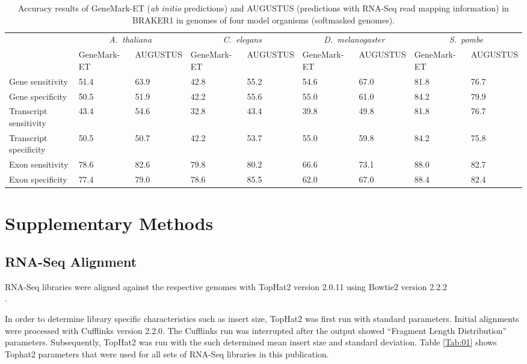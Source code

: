 \documentclass[a4paper,10pt]{report}
\begin{document}
\begin{sidewaystable}
\caption{Accuracy results of GeneMark-ET (\textit{ab initio} predictions) and AUGUSTUS (predictions with RNA-Seq read mapping information) in BRAKER1 in genomes of four model organisms (softmasked genomes).\label{compare}}
\begin{tabular}{lp{1.5cm}p{1.2cm}p{1.5cm}p{1.2cm}p{1.5cm}p{1.2cm}p{1.5cm}p{1.2cm}}\hline
 & \multicolumn{2}{c}{\textit{A.~thaliana}} &  \multicolumn{2}{c}{\textit{C.~elegans}} &  \multicolumn{2}{c}{\textit{D.~melanogaster}} &  \multicolumn{2}{c}{\textit{S.~pombe}}\\
 & \tiny{GeneMark-ET} & \tiny{AUGUSTUS} & \tiny{GeneMark-ET} & \tiny{AUGUSTUS} &  \tiny{GeneMark-ET} & \tiny{AUGUSTUS} & \tiny{GeneMark-ET} &\tiny{AUGUSTUS}\\
 \hline
Gene sensitivity        & 51.4 & 63.9 & 42.8 & 55.2 & 54.6 & 67.0 & 81.8 & 76.7\\
Gene specificity        & 50.5 & 51.9 & 42.2 & 55.6 & 55.0 & 61.0 & 84.2 & 79.9\\
Transcript sensitivity  & 43.4 & 54.6 & 32.8 & 43.4 & 39.8 & 49.8 & 81.8 & 76.7\\
Transcript specificity  & 50.5 & 50.7 & 42.2 & 53.7 & 55.0 & 59.8 & 84.2 & 75.8\\
Exon sensitivity        & 78.6 & 82.6 & 79.8 & 80.2 & 66.6 & 73.1 & 88.0 & 82.7\\
Exon specificity        & 77.4 & 79.0 & 78.6 & 85.5 & 62.0 & 67.0 & 88.4 & 82.4\\
\hline
\end{tabular}
\end{sidewaystable}

\chapter{Supplementary Methods}

\section{RNA-Seq Alignment}

RNA-Seq libraries were aligned against the respective genomes with TopHat2 version 2.0.11 \cite{TopHat2} using Bowtie2 version 2.2.2\\ \cite{Bowtie2}.

In order to determine library specific characteristics such as insert size, TopHat2 was first run with standard parameters. Initial alignments were processed with Cufflinks \cite{Cufflinks} version 2.2.0. The Cufflinks run was interrupted after the output showed ``Fragment Length Distribution'' parameters. Subsequently, TopHat2 was run with the such determined mean insert size and standard deviation. Table \ref{Tab:01} shows Tophat2 parameters that were used for all sets of RNA-Seq libraries in this publication.
\end{document}
